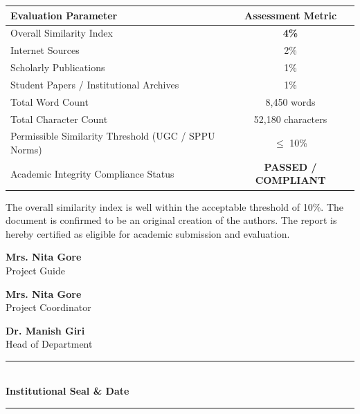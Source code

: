 \vspace{3mm}
\begin{table}[h!]
\centering
\renewcommand{\arraystretch}{1.3}
\begin{tabular}{|l|c|}
\hline
\textbf{Evaluation Parameter} & \textbf{Assessment Metric} \\
\hline\hline
Overall Similarity Index & \textbf{4\%} \\
\hline
Internet Sources & 2\% \\
\hline
Scholarly Publications & 1\% \\
\hline
Student Papers / Institutional Archives & 1\% \\
\hline
Total Word Count & 8,450 words \\
\hline
Total Character Count & 52,180 characters \\
\hline
Permissible Similarity Threshold (UGC / SPPU Norms) & $\le$ 10\% \\
\hline
Academic Integrity Compliance Status & \textbf{PASSED / COMPLIANT} \\
\hline
\end{tabular}
\end{table}

\vspace{2mm}
\noindent The overall similarity index is well within the acceptable threshold of 10\%. The document is confirmed to be an original creation of the authors. The report is hereby certified as eligible for academic submission and evaluation.

\vspace{8mm}
\noindent
\begin{minipage}{0.45\textwidth}
\begin{center}
\textbf{Mrs. Nita Gore} \\
Project Guide
\end{center}
\end{minipage}
\hfill
\begin{minipage}{0.45\textwidth}
\begin{center}
\textbf{Mrs. Nita Gore} \\
Project Coordinator
\end{center}
\end{minipage}

\vspace{7mm}
\noindent
\begin{minipage}{0.45\textwidth}
\begin{center}
\textbf{Dr. Manish Giri} \\
Head of Department
\end{center}
\end{minipage}
\hfill
\begin{minipage}{0.45\textwidth}
\begin{center}
\rule{4.5cm}{0.4pt} \\
\textbf{Institutional Seal \& Date}
\end{center}
\end{minipage}

\vspace{3mm}
\rule{\textwidth}{0.01in}
\clearpage
